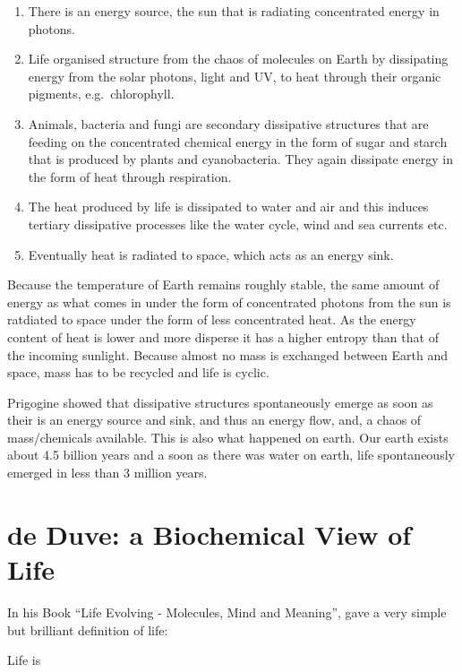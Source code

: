 \documentclass[
  11pt,
]{book}
\begin{document}
\begin{enumerate}
\def\labelenumi{\arabic{enumi}.}
\item
  There is an energy source, the sun that is radiating concentrated energy in photons.
\item
  Life organised structure from the chaos of molecules on Earth by dissipating energy from the solar photons, light and UV, to heat through their organic pigments, e.g.~chlorophyll.
\item
  Animals, bacteria and fungi are secondary dissipative structures that are feeding on the concentrated chemical energy in the form of sugar and starch that is produced by plants and cyanobacteria. They again dissipate energy in the form of heat through respiration.
\item
  The heat produced by life is dissipated to water and air and this induces tertiary dissipative processes like the water cycle, wind and sea currents etc.
\item
  Eventually heat is radiated to space, which acts as an energy sink.
\end{enumerate}

Because the temperature of Earth remains roughly stable, the same amount of energy as what comes in under the form of concentrated photons from the sun is ratdiated to space under the form of less concentrated heat. As the energy content of heat is lower and more disperse it has a higher entropy than that of the incoming sunlight.
Because almost no mass is exchanged between Earth and space, mass has to be recycled and life is cyclic.

Prigogine showed that dissipative structures spontaneously emerge as soon as their is an energy source and sink, and thus an energy flow, and, a chaos of mass/chemicals available.
This is also what happened on earth. Our earth exists about 4.5 billion years and a soon as there was water on earth, life spontaneously emerged in less than 3 million years.

\hypertarget{de-duve-a-biochemical-view-of-life}{%
\section{de Duve: a Biochemical View of Life}\label{de-duve-a-biochemical-view-of-life}}

In his Book ``Life Evolving - Molecules, Mind and Meaning'', \citet{deDuve2002} gave a very simple but brilliant definition of life:

Life is
\end{document}
